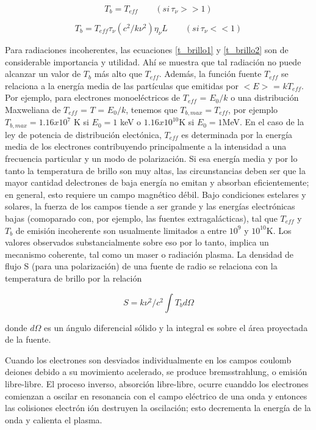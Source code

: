 \begin{equation} \label{t_brillo2}
T_b = T_{eff} \qquad (si \, \tau_\nu >> 1)
\end{equation}

\begin{equation} \label{t_brillo3}
T_b = T_{eff} \tau_\nu (c^2/k\nu^2)\eta_ \nu L \qquad (si \, \tau_\nu << 1)
\end{equation}

Para radiaciones incoherentes, las ecuaciones \ref{t_brillo1} y \ref{t_brillo2} son de considerable importancia y utilidad. Ah\'i se muestra que tal radiaci\'on no puede alcanzar un valor de $T_b$ m\'as alto que $T_{eff}$. Adem\'as, la funci\'on fuente $T_{eff}$ se relaciona a la energ\'ia media de las part\'iculas que emitidas por $<E>$ = $kT_{eff}$. Por ejemplo, para electrones monoel\'ectricos de $T_{eff}$ = $E_0/k$ o una distribuci\'on Maxweliana de $T_{eff}$ = $T$ = $E_0/k$, tenemos que $T_{b,max} = T_{eff}$, por ejemplo $T_{b,max} = 1.16 x 10^7$ K si $E_0 = 1$ keV o $1.16 x 10 ^{10}$K si $E_0 = 1$MeV. En el caso de la ley de potencia de distribuci\'on elect\'onica, $T_{eff}$ es determinada por la energ\'ia media de los electrones contribuyendo principalmente a la intensidad a una frecuencia particular y un modo de polarizaci\'on. Si esa energ\'ia media y por lo tanto la temperatura de brillo son muy altas, las circunstancias  deben ser que la mayor cantidad delectrones de baja energ\'ia no emitan y absorban eficientemente; en general, esto requiere un campo magn\'etico d\'ebil. Bajo condiciones estelares y solares, la fuerza de los campos tiende a ser grande y las energ\'ias electr\'onicas bajas (comoparado con, por ejemplo, las fuentes extragal\'acticas), tal que $T_{eff}$ y $T_b$ de emisi\'on incoherente son usualmente limitados a entre $10^9$ y $10^{10}$K. Los valores observados substancialmente sobre eso por lo tanto, implica un mecanismo coherente, tal como un maser o radiaci\'on plasma.
La densidad de flujo S (para una polarizaci\'on) de una fuente de radio se relaciona con la temperatura de brillo por la relaci\'on

\begin{equation} \label{densidad_flujo}
S = k\nu^2/c^2 \int T_b d\Omega
\end{equation}

donde $d\Omega$ es un \'angulo diferencial s\'olido y la integral es sobre el \'area proyectada de la fuente.

Cuando los electrones son desviados individualmente en los campos coulomb deiones debido a su movimiento acelerado, se produce bremsstrahlung, o emisi\'on libre-libre. El proceso inverso, absorci\'on libre-libre, ocurre cuanddo los electrones comienzan a oscilar en resonancia con el campo el\'ectrico de una onda y entonces las colisiones electr\'on i\'on destruyen la oscilaci\'on; esto decrementa la energ\'ia de la onda y calienta el plasma.

